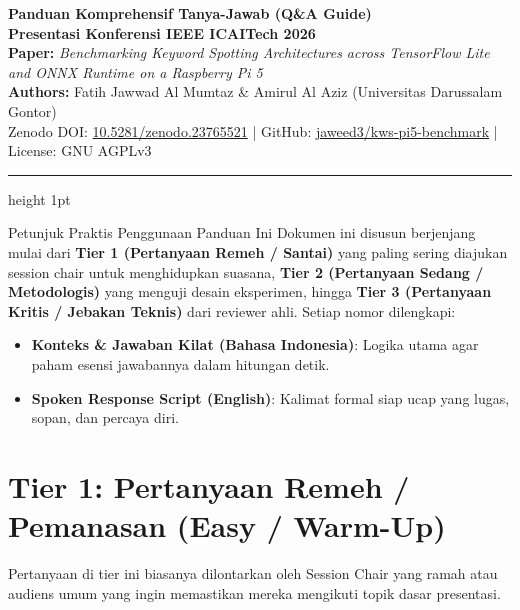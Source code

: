 \documentclass[11pt,a4paper]{article}
\begin{document}
\begin{center}
  {\LARGE\textbf{\textcolor{NavyBlue}{Panduan Komprehensif Tanya-Jawab (Q\&A Guide)}}}\\[0.4ex]
  {\large\textbf{Presentasi Konferensi IEEE ICAITech 2026}}\\[0.8ex]
  {\footnotesize\textbf{Paper:} \textit{Benchmarking Keyword Spotting Architectures across TensorFlow Lite and ONNX Runtime on a Raspberry Pi 5}}\\
  {\footnotesize\textbf{Authors:} Fatih Jawwad Al Mumtaz \& Amirul Al Aziz (Universitas Darussalam Gontor)}\\
  {\scriptsize Zenodo DOI: \href{https://doi.org/10.5281/zenodo.23765521}{10.5281/zenodo.23765521} \quad | \quad GitHub: \href{https://github.com/jaweed3/kws-pi5-benchmark}{jaweed3/kws-pi5-benchmark} \quad | \quad License: GNU AGPLv3}
\end{center}
\vspace{-0.5em}
\hrule height 1pt
\vspace{1.0em}

\begin{tipbox}{Petunjuk Praktis Penggunaan Panduan Ini}
Dokumen ini disusun berjenjang mulai dari \textbf{Tier 1 (Pertanyaan Remeh / Santai)} yang paling sering diajukan session chair untuk menghidupkan suasana, \textbf{Tier 2 (Pertanyaan Sedang / Metodologis)} yang menguji desain eksperimen, hingga \textbf{Tier 3 (Pertanyaan Kritis / Jebakan Teknis)} dari reviewer ahli. Setiap nomor dilengkapi:
\begin{itemize}[noitemsep,topsep=1pt]
  \item \textbf{Konteks \& Jawaban Kilat (Bahasa Indonesia)}: Logika utama agar paham esensi jawabannya dalam hitungan detik.
  \item \textbf{Spoken Response Script (English)}: Kalimat formal siap ucap yang lugas, sopan, dan percaya diri.
\end{itemize}
\end{tipbox}

\section*{\textcolor{TierGreenBorder}{\Large Tier 1: Pertanyaan Remeh / Pemanasan (Easy / Warm-Up)}}
Pertanyaan di tier ini biasanya dilontarkan oleh Session Chair yang ramah atau audiens umum yang ingin memastikan mereka mengikuti topik dasar presentasi.
\end{document}
